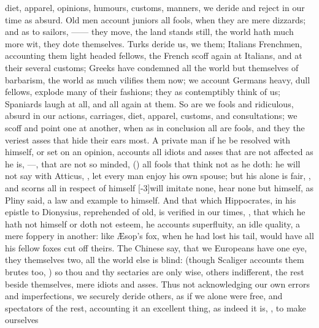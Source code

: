 {diet, apparel, opinions, humours, customs, manners, we deride and
reject in our time as absurd. Old men account juniors all fools, when
they are mere dizzards; and as to sailors, ------ they move, the land stands still, the world hath much more
wit, they dote themselves. Turks deride us, we them; Italians
Frenchmen, accounting them light headed fellows, the French scoff again
at Italians, and at their several customs; Greeks have condemned all
the world but themselves of barbarism, the world as much vilifies them
now; we account Germans heavy, dull fellows, explode many of their
fashions; they as contemptibly think of us; Spaniards laugh at all, and
all again at them. So are we fools and ridiculous, absurd in our
actions, carriages, diet, apparel, customs, and consultations; we 
scoff and point one at another, when as in conclusion all are fools,
 and they the veriest asses that hide their ears most. A private
man if he be resolved with himself, or set on an opinion, accounts all
idiots and asses that are not affected as he is, ---, that are not so minded, () all fools that think not as he
doth: he will not say with Atticus, ,
let every man enjoy his own spouse; but his alone is fair, ,
\etc{} and scorns all in respect of himself [-3\baselineskip]will imitate none, hear
none but himself, as Pliny said, a law and example to himself. And
that which Hippocrates, in his epistle to Dionysius, reprehended of
old, is verified in our times, , that which he hath not himself or doth
not esteem, he accounts superfluity, an idle quality, a mere foppery in
another: like \AE{}sop's fox, when he had lost his tail, would have all
his fellow foxes cut off theirs. The Chinese say, that we Europeans
have one eye, they themselves two, all the world else is blind: (though
Scaliger accounts them brutes too, ) so thou and thy
sectaries are only wise, others indifferent, the rest beside
themselves, mere idiots and asses. Thus not acknowledging our own
errors and imperfections, we securely deride others, as if we alone
were free, and spectators of the rest, accounting it an excellent
thing, as indeed it is, , to make ourselves
}
